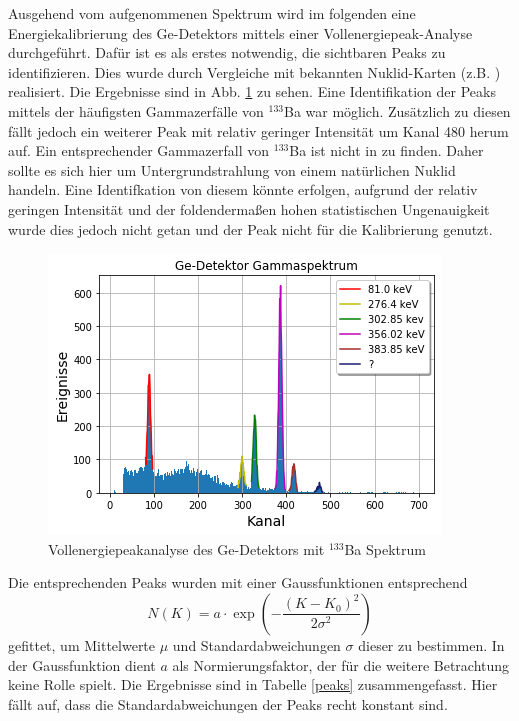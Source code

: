 Ausgehend vom aufgenommenen Spektrum wird im folgenden eine Energiekalibrierung des Ge-Detektors mittels einer Vollenergiepeak-Analyse durchgeführt.
Dafür ist es als erstes notwendig, die sichtbaren Peaks zu identifizieren.
Dies wurde durch Vergleiche mit bekannten Nuklid-Karten (z.B. \cite{IAEA}) realisiert.
Die Ergebnisse sind in Abb. \ref{GeKali} zu sehen.
Eine Identifikation der Peaks mittels der häufigsten Gammazerfälle von $^{133}$Ba war möglich.
Zusätzlich zu diesen fällt jedoch ein weiterer Peak mit relativ geringer Intensität um Kanal 480 herum auf.
Ein entsprechender Gammazerfall von $^{133}$Ba ist nicht in \cite{IAEA} zu finden.
Daher sollte es sich hier um Untergrundstrahlung von einem natürlichen Nuklid handeln.
Eine Identifkation von diesem könnte erfolgen, aufgrund der relativ geringen Intensität und der foldendermaßen hohen statistischen Ungenauigkeit wurde dies jedoch nicht getan und der Peak nicht für die Kalibrierung genutzt.

\begin{figure}[h]
  \includegraphics[width=\linewidth]{images/ba133Kali.png}
  \caption{Vollenergiepeakanalyse des Ge-Detektors mit $^{133}$Ba Spektrum}
  \label{GeKali}
\end{figure}

Die entsprechenden Peaks wurden mit einer Gaussfunktionen entsprechend
\begin{equation}
N(K) = a \cdot \exp \left( - \frac{(K - K_{0})^{2}}{2 \sigma ^{2}} \right)
\end{equation}
gefittet, um Mittelwerte $\mu$ und Standardabweichungen $\sigma$ dieser zu bestimmen.
In der Gaussfunktion dient $a$ als Normierungsfaktor, der für die weitere Betrachtung keine Rolle spielt.
Die Ergebnisse sind in Tabelle \ref{peaks} zusammengefasst.
Hier fällt auf, dass die Standardabweichungen der Peaks recht konstant sind.

